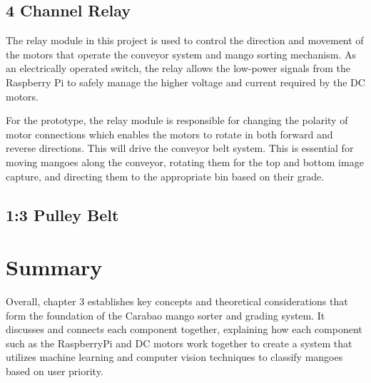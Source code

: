 \subsection{4 Channel Relay}
The relay module in this project is used to control the direction and movement
of the motors that operate the conveyor system and mango sorting mechanism. As
an electrically operated switch, the relay allows the low-power signals from the
Raspberry Pi to safely manage the higher voltage and current required by the DC
motors.

For the prototype, the relay module is responsible for changing the polarity of
motor connections which enables the motors to rotate in both forward and reverse
directions. This will drive the conveyor belt system. This is essential for
moving mangoes along the conveyor, rotating them for the top and bottom image
capture, and directing them to the appropriate bin based on their grade.

\subsection{1:3 Pulley Belt}


\section{Summary}

Overall, chapter 3 establishes key concepts and theoretical considerations that form the foundation of the Carabao mango sorter and grading system. It discusses and connects each component together, explaining how each component such as the RaspberryPi and DC motors work together to create a system that utilizes machine learning and computer vision techniques to classify mangoes based on user priority.

